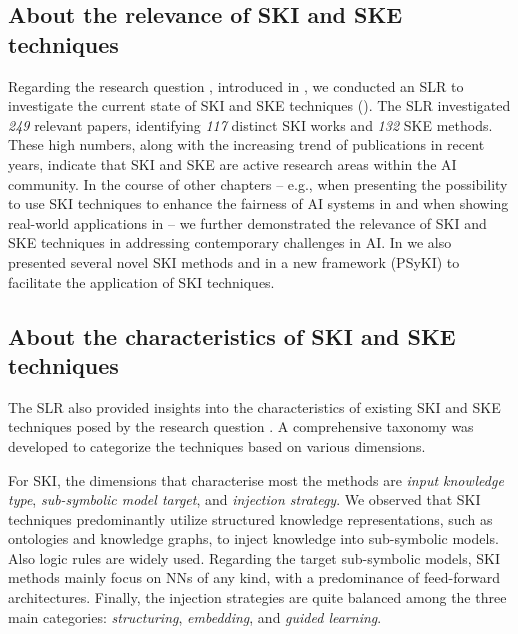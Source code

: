\subsection*{About the relevance of \gls{SKI} and \gls{SKE} techniques}
%
Regarding the research question , introduced in , we conducted an \gls{SLR} to investigate the current state of \gls{SKI} and \gls{SKE} techniques ().
%
The \gls{SLR} investigated \emph{249} relevant papers, identifying \emph{117} distinct \gls{SKI} works and \emph{132} \gls{SKE} methods.
%
These high numbers, along with the increasing trend of publications in recent years, indicate that \gls{SKI} and \gls{SKE} are active research areas within the \gls{AI} community.
%
In the course of other chapters -- e.g., when presenting the possibility to use \gls{SKI} techniques to enhance the fairness of \gls{AI} systems in  and when showing real-world applications in  -- we further demonstrated the relevance of \gls{SKI} and \gls{SKE} techniques in addressing contemporary challenges in \gls{AI}.
%
In  we also presented several novel \gls{SKI} methods and in  a new framework (\gls{PSyKI}) to facilitate the application of \gls{SKI} techniques.


\subsection*{About the characteristics of \gls{SKI} and \gls{SKE} techniques}
%
The \gls{SLR} also provided insights into the characteristics of existing \gls{SKI} and \gls{SKE} techniques posed by the research question .
%
A comprehensive taxonomy was developed to categorize the techniques based on various dimensions.


For \gls{SKI}, the dimensions that characterise most the methods are \emph{input knowledge type}, \emph{sub-symbolic model target}, and \emph{injection strategy}.
%
We observed that \gls{SKI} techniques predominantly utilize structured knowledge representations, such as ontologies and knowledge graphs, to inject knowledge into sub-symbolic models.
%
Also logic rules are widely used.
%
Regarding the target sub-symbolic models, \gls{SKI} methods mainly focus on \glspl{NN} of any kind, with a predominance of feed-forward architectures.
%
Finally, the injection strategies are quite balanced among the three main categories: \emph{structuring}, \emph{embedding}, and \emph{guided learning}.


